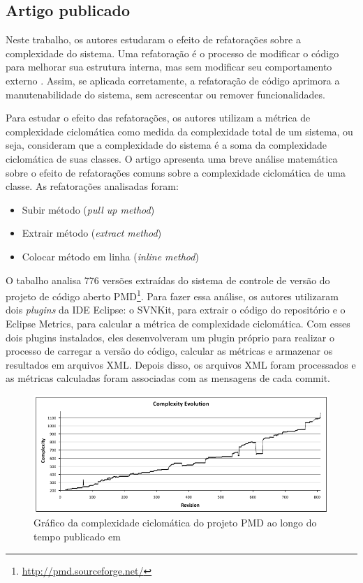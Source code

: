 \documentclass[a4paper, 12pt, twoside]{book}
\begin{document}
        \subsection*{Artigo publicado}

        Neste trabalho, os autores estudaram o efeito de refatorações sobre a complexidade do sistema. Uma refatoração é o processo de modificar o código para melhorar sua estrutura interna, mas sem modificar seu comportamento externo \cite{fowler-refactoring}. Assim, se aplicada corretamente, a refatoração de código aprimora a manutenabilidade do sistema, sem acrescentar ou remover funcionalidades.

        Para estudar o efeito das refatorações, os autores utilizam a métrica de complexidade ciclomática como medida da complexidade total de um sistema, ou seja, consideram que a complexidade do sistema é a soma da complexidade ciclomática de suas classes. O artigo apresenta uma breve análise matemática sobre o efeito de refatorações comuns sobre a complexidade ciclomática de uma classe. As refatorações analisadas foram:

        \begin{itemize}
            \item Subir método (\textit{pull up method})
            \item Extrair método (\textit{extract method})
            \item Colocar método em linha (\textit{inline method})
        \end{itemize}

        O tabalho analisa 776 versões extraídas do sistema de controle de versão do projeto de código aberto PMD\footnote{\url{http://pmd.sourceforge.net/}}. Para fazer essa análise, os autores utilizaram dois \textit{plugins} da IDE Eclipse: o SVNKit, para extrair o código do repositório e o Eclipse Metrics, para calcular a métrica de complexidade ciclomática. Com esses dois plugins instalados, eles desenvolveram um plugin próprio para realizar o processo de carregar a versão do código, calcular as métricas e armazenar os resultados em arquivos XML. Depois disso, os arquivos XML foram processados e as métricas calculadas foram associadas com as mensagens de cada commit.

        \begin{figure}[ht]
            \centering
            \includegraphics[width=1.0\textwidth]{img/cc-soetens.png}
            \caption{Gráfico da complexidade ciclomática do projeto PMD ao longo do tempo publicado em \cite{SoetensQUATIC2010}}
            \label{fig:evolucao-soetens}
        \end{figure}
\end{document}
